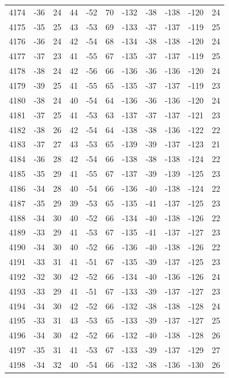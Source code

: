 \begin{table}[H]
\begin{tabular}{lllllllllll}
4174 & -36 & 24 & 44 & -52 & 70 & -132 & -38 & -138 & -120 & 24 \\
4175 & -35 & 25 & 43 & -53 & 69 & -133 & -37 & -137 & -119 & 25 \\
4176 & -36 & 24 & 42 & -54 & 68 & -134 & -38 & -138 & -120 & 24 \\
4177 & -37 & 23 & 41 & -55 & 67 & -135 & -37 & -137 & -119 & 25 \\
4178 & -38 & 24 & 42 & -56 & 66 & -136 & -36 & -136 & -120 & 24 \\
4179 & -39 & 25 & 41 & -55 & 65 & -135 & -37 & -137 & -119 & 23 \\
4180 & -38 & 24 & 40 & -54 & 64 & -136 & -36 & -136 & -120 & 24 \\
4181 & -37 & 25 & 41 & -53 & 63 & -137 & -37 & -137 & -121 & 23 \\
4182 & -38 & 26 & 42 & -54 & 64 & -138 & -38 & -136 & -122 & 22 \\
4183 & -37 & 27 & 43 & -53 & 65 & -139 & -39 & -137 & -123 & 21 \\
4184 & -36 & 28 & 42 & -54 & 66 & -138 & -38 & -138 & -124 & 22 \\
4185 & -35 & 29 & 41 & -55 & 67 & -137 & -39 & -139 & -125 & 23 \\
4186 & -34 & 28 & 40 & -54 & 66 & -136 & -40 & -138 & -124 & 22 \\
4187 & -35 & 29 & 39 & -53 & 65 & -135 & -41 & -137 & -125 & 23 \\
4188 & -34 & 30 & 40 & -52 & 66 & -134 & -40 & -138 & -126 & 22 \\
4189 & -33 & 29 & 41 & -53 & 67 & -135 & -41 & -137 & -127 & 23 \\
4190 & -34 & 30 & 40 & -52 & 66 & -136 & -40 & -138 & -126 & 22 \\
4191 & -33 & 31 & 41 & -51 & 67 & -135 & -39 & -137 & -125 & 23 \\
4192 & -32 & 30 & 42 & -52 & 66 & -134 & -40 & -136 & -126 & 24 \\
4193 & -33 & 29 & 41 & -51 & 67 & -133 & -39 & -137 & -127 & 23 \\
4194 & -34 & 30 & 42 & -52 & 66 & -132 & -38 & -138 & -128 & 24 \\
4195 & -33 & 31 & 43 & -53 & 65 & -133 & -39 & -137 & -127 & 25 \\
4196 & -34 & 30 & 42 & -52 & 66 & -132 & -40 & -138 & -128 & 26 \\
4197 & -35 & 31 & 41 & -53 & 67 & -133 & -39 & -137 & -129 & 27 \\
4198 & -34 & 32 & 40 & -54 & 66 & -132 & -38 & -136 & -130 & 26 \\

\end{tabular}
\end{table}
